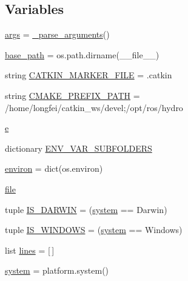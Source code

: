 \subsection*{Variables}
\begin{DoxyCompactItemize}
\item 
\hyperlink{namespace__setup__util_a547963d07c6371df1c51b1384a2dec28}{args} = \hyperlink{namespace__setup__util_a57d9ecb280810c9a5409d44aeb9d0a25}{\+\_\+parse\+\_\+arguments}()
\item 
\hyperlink{namespace__setup__util_a83d25140acd7788bbcb95843fe38e639}{base\+\_\+path} = os.\+path.\+dirname(\+\_\+\+\_\+file\+\_\+\+\_\+)
\item 
string \hyperlink{namespace__setup__util_a3fa0ca5a460a71a43cbc3d4954ab1f10}{C\+A\+T\+K\+I\+N\+\_\+\+M\+A\+R\+K\+E\+R\+\_\+\+F\+I\+LE} = \textquotesingle{}.catkin\textquotesingle{}
\item 
string \hyperlink{namespace__setup__util_a57afd3d2c076955fb715f3e72ef098eb}{C\+M\+A\+K\+E\+\_\+\+P\+R\+E\+F\+I\+X\+\_\+\+P\+A\+TH} = \textquotesingle{}/home/longfei/catkin\+\_\+ws/devel;/opt/ros/hydro\textquotesingle{}
\item 
\hyperlink{namespace__setup__util_acdce690b925de33d6249bbbfa1109d61}{e}
\item 
dictionary \hyperlink{namespace__setup__util_aa31804f1be8660156ce9394b33c68dc4}{E\+N\+V\+\_\+\+V\+A\+R\+\_\+\+S\+U\+B\+F\+O\+L\+D\+E\+RS}
\item 
\hyperlink{namespace__setup__util_a9a935bdd9ee1aa0327161025bb18c136}{environ} = dict(os.\+environ)
\item 
\hyperlink{namespace__setup__util_aea63a1b32cc79bc3d872ab7cb30dd07e}{file}
\item 
tuple \hyperlink{namespace__setup__util_aecbb100ce6f94bb3c7e16d58fde05f96}{I\+S\+\_\+\+D\+A\+R\+W\+IN} = (\hyperlink{namespace__setup__util_ae9fca6a80a6923f4580be72f68fee325}{system} == \textquotesingle{}Darwin\textquotesingle{})
\item 
tuple \hyperlink{namespace__setup__util_a6fe69c2dbd92959b6651a28cbb846e6e}{I\+S\+\_\+\+W\+I\+N\+D\+O\+WS} = (\hyperlink{namespace__setup__util_ae9fca6a80a6923f4580be72f68fee325}{system} == \textquotesingle{}Windows\textquotesingle{})
\item 
list \hyperlink{namespace__setup__util_a8618d8be5f729d4c9696daa5e083a001}{lines} = \mbox{[}$\,$\mbox{]}
\item 
\hyperlink{namespace__setup__util_ae9fca6a80a6923f4580be72f68fee325}{system} = platform.\+system()
\end{DoxyCompactItemize}


